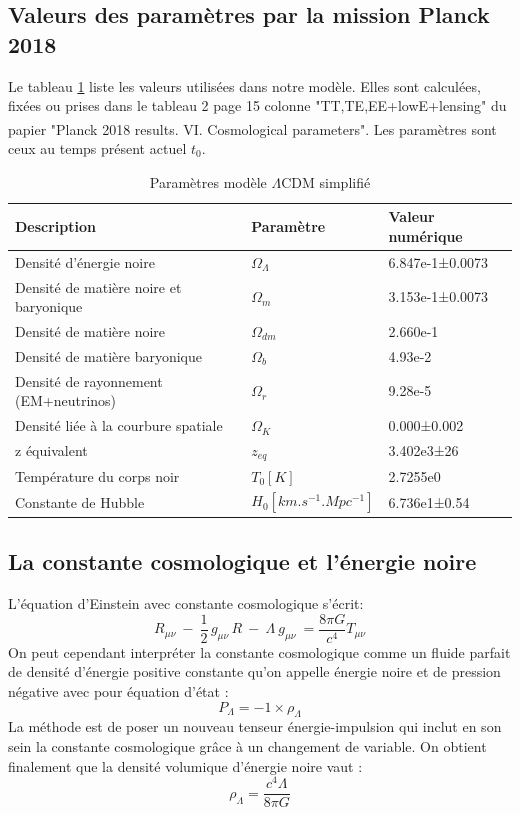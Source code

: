 \documentclass[10pt, a4paper]{report}
\numberwithin{equation}{subsection}
\begin{document}
\subsection{Valeurs des paramètres par la mission Planck 2018}
Le tableau \ref{tab:PI} liste les valeurs utilisées dans notre modèle. Elles sont calculées, fixées ou prises dans le tableau 2 page 15 colonne "TT,TE,EE+lowE+lensing" du papier "Planck 2018 results. VI. Cosmological parameters"\textsuperscript{\cite{Planck2018}}. Les paramètres sont ceux au temps présent actuel $t_0$. 
\begin{table}
\begin{center}
\begin{tabular}{ m{5cm} m{5cm} m{5cm}} 
 \hline
 Description & Paramètre & Valeur numérique\\ 
 \hline
Densité d'énergie noire & $\Omega_\Lambda$ & 6.847e-1±0.0073\\ 
Densité de matière noire et baryonique & $\Omega_m$ & 3.153e-1±0.0073\\ 
Densité de matière noire & $\Omega_{dm}$ & 2.660e-1\\ 
Densité de matière baryonique & $\Omega_b$ & 4.93e-2\\ 
Densité de rayonnement (EM+neutrinos) & $\Omega_r$ & 9.28e-5\\
Densité liée à la courbure spatiale & $\Omega_K$ & 0.000±0.002\\
z équivalent & $z_{eq}$ & 3.402e3±26\\
Température du corps noir & $T_0 [K]$ & 2.7255e0\\ 
Constante de Hubble & $H_0 [km.s^{-1}.Mpc^{-1}]$ & 6.736e1±0.54\\ 
 \hline

\end{tabular}
\end{center}
\caption{Paramètres modèle $\Lambda$CDM simplifié}
\label{tab:PI}
\end{table}

\subsection{La constante cosmologique et l'énergie noire}
L'équation d'Einstein avec constante cosmologique s'écrit:
\begin{equation} \label{eq:EFEL}
\boxed{R_{\mu \nu} \ - \ \frac{1}{2} \, g_{\mu \nu} \, R  \ - \ \Lambda \ g_{\mu \nu} \ =  \frac{8 \pi G}{c^4}  T_{\mu \nu}}
\end{equation}
On peut cependant interpréter la constante cosmologique comme un fluide parfait de densité d'énergie positive constante qu'on appelle énergie noire et de pression négative avec pour équation d'état :
\begin{equation} \label{eq:EEL}
\boxed{P_\Lambda=-1 \times \rho_\Lambda}
\end{equation}
La méthode est de poser un nouveau tenseur énergie-impulsion qui inclut en son sein la constante cosmologique grâce à un changement de variable. On obtient finalement que la densité volumique d'énergie noire vaut :
\begin{equation} \label{eq:DEL}
\boxed{\rho_{\Lambda}  =  \frac{c^4 \Lambda}{8\pi G}}
\end{equation}
\end{document}
